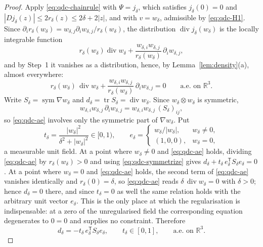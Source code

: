 \documentclass[11pt]{article}
\theoremstyle{definition}
\theoremstyle{plain}
\newcommand{\R}{\mathbb R}
\begin{document}
\begin{proof}
Apply \eqref{eq:qdc-chainrule} with $\Psi=j_\delta$, which satisfies
$j_\delta(0)=0$ and $|Dj_\delta(z)|\le2r_\delta(z)\le2\delta+2|z|$, and with
$v=w_\delta$, admissible by \eqref{eq:qdc-H1}.  Since
$\partial_ir_\delta(w_\delta)=w_{\delta,j}\partial_iw_{\delta,j}/r_\delta(w_\delta)$,
the distribution $\operatorname{div}j_\delta(w_\delta)$ is the locally
integrable function
\[
 r_\delta(w_\delta)\operatorname{div}w_\delta
 +\frac{w_{\delta,i}w_{\delta,j}}{r_\delta(w_\delta)}\,\partial_iw_{\delta,j},
\]
and by Step~1 it vanishes as a distribution, hence, by
Lemma~\ref{lem:density}(a), almost everywhere:
\begin{equation}\label{eq:qdc-ae}
 r_\delta(w_\delta)\,\operatorname{div}w_\delta
 +\frac{w_{\delta,i}w_{\delta,j}}{r_\delta(w_\delta)}\,\partial_iw_{\delta,j}=0
 \qquad\text{a.e.\ on }\R^3 .
\end{equation}
Write $S_\delta=\operatorname{sym}\nabla w_\delta$ and
$d_\delta=\operatorname{tr}S_\delta=\operatorname{div}w_\delta$.  Since
$w_\delta\otimes w_\delta$ is symmetric,
\begin{equation}\label{eq:qdc-symmetrize}
 w_{\delta,i}w_{\delta,j}\,\partial_iw_{\delta,j}
 =w_{\delta,i}w_{\delta,j}\,(S_\delta)_{ij},
\end{equation}
so \eqref{eq:qdc-ae} involves only the symmetric part of $\nabla w_\delta$.
Put
\[
 t_\delta=\frac{|w_\delta|^2}{\delta^2+|w_\delta|^2}\in[0,1),
 \qquad
 e_\delta=\begin{cases}w_\delta/|w_\delta|,&w_\delta\ne0,\\
 (1,0,0),&w_\delta=0,\end{cases}
\]
a measurable unit field.  At a point where $w_\delta\ne0$ and
\eqref{eq:qdc-ae} holds, dividing \eqref{eq:qdc-ae} by
$r_\delta(w_\delta)>0$ and using \eqref{eq:qdc-symmetrize} gives
$d_\delta+t_\delta\,e_\delta^{\mathsf T}S_\delta e_\delta=0$.  At a point
where $w_\delta=0$ and \eqref{eq:qdc-ae} holds, the second term of
\eqref{eq:qdc-ae} vanishes identically and $r_\delta(0)=\delta$, so
\eqref{eq:qdc-ae} reads $\delta\,\operatorname{div}w_\delta=0$ with
$\delta>0$; hence $d_\delta=0$ there, and since $t_\delta=0$ as well the
same relation holds with the arbitrary unit vector $e_\delta$.  This is the
only place at which the regularisation is indispensable: at a zero of the
unregularised field the corresponding equation degenerates to $0=0$ and
supplies no constraint.  Therefore
\begin{equation}\label{eq:qdc-pointwise}
 d_\delta=-t_\delta\,e_\delta^{\mathsf T}S_\delta e_\delta,
 \qquad t_\delta\in[0,1],
 \qquad\text{a.e.\ on }\R^3 .
\end{equation}


\end{proof}
\end{document}

